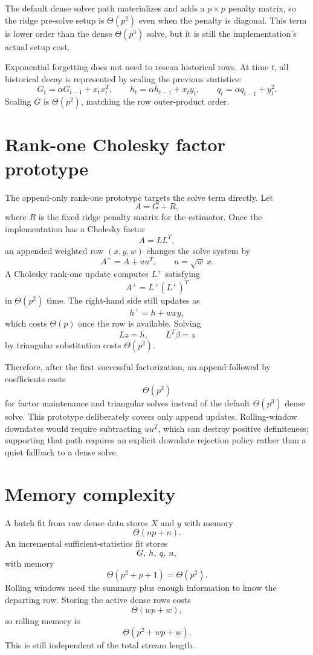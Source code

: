 \documentclass[11pt]{article}
\begin{document}
The default dense solver path materializes and adds a \(p \times p\)
penalty matrix, so the ridge pre-solve setup is \(\Theta(p^2)\) even
when the penalty is diagonal.  This term is lower order than the dense
\(\Theta(p^3)\) solve, but it is still the implementation's actual
setup cost.

Exponential forgetting does not need to rescan historical rows.  At
time \(t\), all historical decay is represented by scaling the previous
statistics:
\[
  G_t=\alpha G_{t-1}+x_tx_t^T,\qquad
  h_t=\alpha h_{t-1}+x_ty_t,\qquad
  q_t=\alpha q_{t-1}+y_t^2 .
\]
Scaling \(G\) is \(\Theta(p^2)\), matching the row outer-product order.

\section{Rank-one Cholesky factor prototype}

The append-only rank-one prototype targets the solve term directly.  Let
\[
  A = G + R,
\]
where \(R\) is the fixed ridge penalty matrix for the estimator.  Once
the implementation has a Cholesky factor
\[
  A = LL^T,
\]
an appended weighted row \((x,y,w)\) changes the solve system by
\[
  A^+ = A + uu^T,\qquad u=\sqrt{w}\,x .
\]
A Cholesky rank-one update computes \(L^+\) satisfying
\[
  A^+ = L^+(L^+)^T
\]
in \(\Theta(p^2)\) time.  The right-hand side still updates as
\[
  h^+ = h + wxy,
\]
which costs \(\Theta(p)\) once the row is available.  Solving
\[
  Lz=h,\qquad L^T\beta=z
\]
by triangular substitution costs \(\Theta(p^2)\).

Therefore, after the first successful factorization, an append followed
by coefficients costs
\[
  \Theta(p^2)
\]
for factor maintenance and triangular solves instead of the default
\(\Theta(p^3)\) dense solve.  This prototype deliberately covers only
append updates.  Rolling-window downdates would require subtracting
\(uu^T\), which can destroy positive definiteness; supporting that path
requires an explicit downdate rejection policy rather than a quiet
fallback to a dense solve.

\section{Memory complexity}

A batch fit from raw dense data stores \(X\) and \(y\) with memory
\[
  \Theta(np+n).
\]
An incremental sufficient-statistics fit stores
\[
  G,\ h,\ q,\ n,
\]
with memory
\[
  \Theta(p^2+p+1)=\Theta(p^2).
\]
Rolling windows need the summary plus enough information to know the
departing row.  Storing the active dense rows costs
\[
  \Theta(wp+w),
\]
so rolling memory is
\[
  \Theta(p^2+wp+w).
\]
This is still independent of the total stream length.
\end{document}
